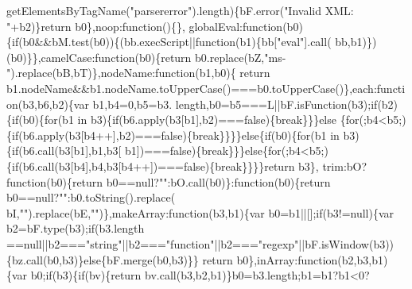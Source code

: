 \begin{DoxyCode}
      getElementsByTagName(\textcolor{stringliteral}{"parsererror"}).length)\{bF.error(\textcolor{stringliteral}{"Invalid XML: "}+b2)\}\textcolor{keywordflow}{return} b0\},noop:\textcolor{keyword}{function}()\{\},
      globalEval:\textcolor{keyword}{function}(b0)\{\textcolor{keywordflow}{if}(b0&&bM.test(b0))\{(bb.execScript||\textcolor{keyword}{function}(b1)\{bb[\textcolor{stringliteral}{"eval"}].call(
      bb,b1)\})(b0)\}\},camelCase:\textcolor{keyword}{function}(b0)\{\textcolor{keywordflow}{return} b0.replace(bZ,\textcolor{stringliteral}{"ms-"}).replace(bB,bT)\},nodeName:\textcolor{keyword}{function}(b1,b0)\{\textcolor{keywordflow}{
      return} b1.nodeName&&b1.nodeName.toUpperCase()===b0.toUpperCase()\},each:\textcolor{keyword}{function}(b3,b6,b2)\{var b1,b4=0,b5=b3.
      length,b0=b5===L||bF.isFunction(b3);\textcolor{keywordflow}{if}(b2)\{\textcolor{keywordflow}{if}(b0)\{\textcolor{keywordflow}{for}(b1 in b3)\{\textcolor{keywordflow}{if}(b6.apply(b3[b1],b2)===\textcolor{keyword}{false})\{\textcolor{keywordflow}{break}\}\}\}\textcolor{keywordflow}{else}
      \{\textcolor{keywordflow}{for}(;b4<b5;)\{\textcolor{keywordflow}{if}(b6.apply(b3[b4++],b2)===\textcolor{keyword}{false})\{\textcolor{keywordflow}{break}\}\}\}\}\textcolor{keywordflow}{else}\{\textcolor{keywordflow}{if}(b0)\{\textcolor{keywordflow}{for}(b1 in b3)\{\textcolor{keywordflow}{if}(b6.call(b3[b1],b1,b3[
      b1])===\textcolor{keyword}{false})\{\textcolor{keywordflow}{break}\}\}\}\textcolor{keywordflow}{else}\{\textcolor{keywordflow}{for}(;b4<b5;)\{\textcolor{keywordflow}{if}(b6.call(b3[b4],b4,b3[b4++])===\textcolor{keyword}{false})\{\textcolor{keywordflow}{break}\}\}\}\}\textcolor{keywordflow}{return} b3\},
      trim:bO?\textcolor{keyword}{function}(b0)\{\textcolor{keywordflow}{return} b0==null?\textcolor{stringliteral}{""}:bO.call(b0)\}:\textcolor{keyword}{function}(b0)\{\textcolor{keywordflow}{return} b0==null?\textcolor{stringliteral}{""}:b0.toString().replace(
      bI,\textcolor{stringliteral}{""}).replace(bE,\textcolor{stringliteral}{""})\},makeArray:\textcolor{keyword}{function}(b3,b1)\{var b0=b1||[];\textcolor{keywordflow}{if}(b3!=null)\{var b2=bF.type(b3);\textcolor{keywordflow}{if}(b3.length
      ==null||b2===\textcolor{stringliteral}{"string"}||b2===\textcolor{stringliteral}{"function"}||b2===\textcolor{stringliteral}{"regexp"}||bF.isWindow(b3))\{bz.call(b0,b3)\}\textcolor{keywordflow}{else}\{bF.merge(b0,b3)\}\}\textcolor{keywordflow}{
      return} b0\},inArray:\textcolor{keyword}{function}(b2,b3,b1)\{var b0;\textcolor{keywordflow}{if}(b3)\{\textcolor{keywordflow}{if}(bv)\{\textcolor{keywordflow}{return} bv.call(b3,b2,b1)\}b0=b3.length;b1=b1?b1<0?

\end{DoxyCode}
